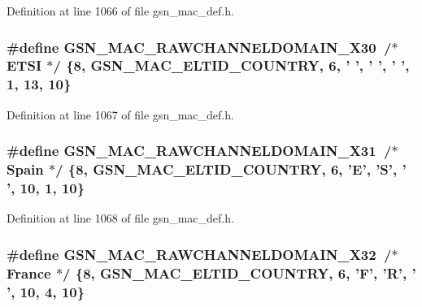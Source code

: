 Definition at line 1066 of file gsn\_\-mac\_\-def.h.

\hypertarget{a00642_gae86f5fe270e13731354c040379263373}{
\subsubsection[{GSN\_\-MAC\_\-RAWCHANNELDOMAIN\_\-X30}]{\setlength{\rightskip}{0pt plus 5cm}\#define GSN\_\-MAC\_\-RAWCHANNELDOMAIN\_\-X30~/$\ast$ ETSI   $\ast$/ \{8, GSN\_\-MAC\_\-ELTID\_\-COUNTRY, 6, ' ', ' ', ' ', 1, 13, 10\}}}
\label{a00642_gae86f5fe270e13731354c040379263373}


Definition at line 1067 of file gsn\_\-mac\_\-def.h.

\hypertarget{a00642_ga8f1d8d62d0476db2e67ae76fbbd8edcb}{
\subsubsection[{GSN\_\-MAC\_\-RAWCHANNELDOMAIN\_\-X31}]{\setlength{\rightskip}{0pt plus 5cm}\#define GSN\_\-MAC\_\-RAWCHANNELDOMAIN\_\-X31~/$\ast$ Spain  $\ast$/ \{8, GSN\_\-MAC\_\-ELTID\_\-COUNTRY, 6, 'E', 'S', ' ', 10, 1, 10\}}}
\label{a00642_ga8f1d8d62d0476db2e67ae76fbbd8edcb}


Definition at line 1068 of file gsn\_\-mac\_\-def.h.

\hypertarget{a00642_gae1d4ccda0a4874b368916cf6bffd8dd9}{
\subsubsection[{GSN\_\-MAC\_\-RAWCHANNELDOMAIN\_\-X32}]{\setlength{\rightskip}{0pt plus 5cm}\#define GSN\_\-MAC\_\-RAWCHANNELDOMAIN\_\-X32~/$\ast$ France $\ast$/ \{8, GSN\_\-MAC\_\-ELTID\_\-COUNTRY, 6, 'F', 'R', ' ', 10, 4, 10\}}}
\label{a00642_gae1d4ccda0a4874b368916cf6bffd8dd9}


